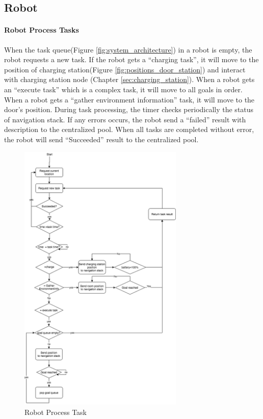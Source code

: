 \subsection{Robot}

\paragraph{Robot Process Tasks}
When the task queue(Figure \ref{fig:system_architecture}) in a robot is empty, the robot requests a new task. If the robot gets a ``charging task'', it will move to the position of charging station(Figure \ref{fig:positions_door_station}) and interact with charging station node (Chapter \ref{sec:charging_station}).
When a robot gets an ``execute task'' which is a complex task, it will move to all goals in order.
When a robot gets a ``gather environment information'' task, it will move to the door's position.
During task processing, the timer checks periodically the status of navigation stack. If any errors occurs, the robot send a ``failed'' result with description to the centralized pool.  
When all tasks are completed without error, the robot will send ``Succeeded'' result to the centralized pool.


\begin{figure}[htbp]
    \centering
    \includegraphics[width = 0.7\textwidth]{content/images/ch4/robot_process_task.drawio.png}
    \caption{Robot Process Task }
    \label{fig:task_process_robot}
\end{figure}


